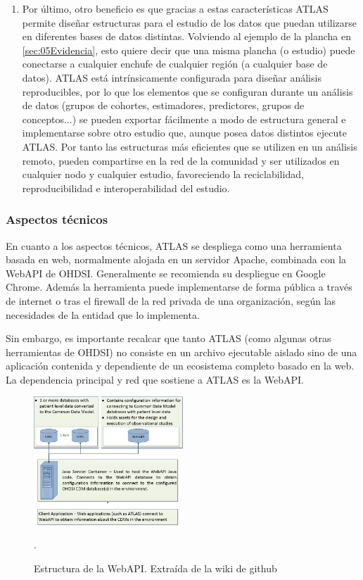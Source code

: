 \begin{enumerate}[label=\roman*.]
     \item Por último, otro beneficio es que gracias a estas características ATLAS permite diseñar estructuras para el estudio de los datos que puedan utilizarse en diferentes bases de datos distintas. Volviendo al ejemplo de la plancha en \ref{sec:05Evidencia}, esto quiere decir que una misma plancha (o estudio) puede conectarse a cualquier enchufe de cualquier región (a cualquier base de datos). ATLAS está intrínsicamente configurada para diseñar análisis reproducibles, por lo que los elementos que se configuran durante un análisis de datos (grupos de cohortes, estimadores, predictores, grupos de conceptos...) se pueden exportar fácilmente a modo de estructura general e implementarse sobre otro estudio que, aunque posea datos distintos ejecute ATLAS. Por tanto las estructuras más eficientes que se utilizen en un análisis remoto, pueden compartirse en la red de la comunidad y ser utilizados en cualquier nodo y cualquier estudio, favoreciendo la reciclabilidad, reproducibilidad e interoperabilidad del estudio.
    
\end{enumerate}

\subsubsection{Aspectos técnicos}

En cuanto a los aspectos técnicos, ATLAS se despliega como una herramienta basada en web, normalmente alojada en un servidor Apache, combinada con la WebAPI de OHDSI. Generalmente se recomienda su despliegue en Google Chrome. Además la herramienta puede implementarse de forma pública a través de internet o tras el firewall de la red privada de una organización, según las necesidades de la entidad que lo implementa.

Sin embargo, es importante recalcar que tanto ATLAS (como algunas otras herramientas de OHDSI) no consiste en un archivo ejecutable aislado sino de una aplicación contenida y dependiente de un ecosistema completo basado en la web. La dependencia principal y red que sostiene a ATLAS es la WebAPI.

\begin{figure}[H]
    \centering
    \includegraphics[width=0.50\textwidth]{figures/webAPIwiki.png}
     \caption{Estructura de la WebAPI. Extraída de la wiki de github \cite{githubWebAPIwiki}}.
    \label{fig:webAPIwiki}
\end{figure}

